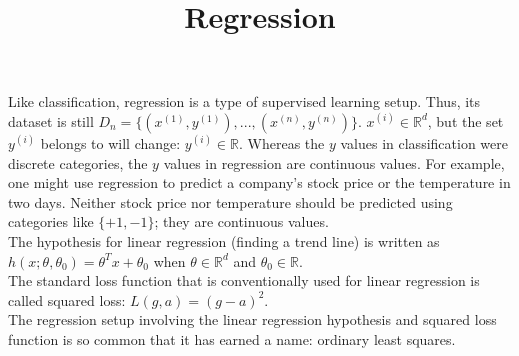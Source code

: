 \documentclass{article}
\title{Regression}
\author{ }
\date{ }
\begin{document}
	
	\maketitle 

    Like classification, regression is a type of supervised learning setup. Thus, its dataset is still $D_n = \{(x^{(1)}, y^{(1)}), ... ,(x^{(n)}, y^{(n)})\}$. $x^{(i)}\in\mathbb{R}^d$, but the set $y^{(i)}$ belongs to will change: $y^{(i)}\in\mathbb{R}$. Whereas the $y$ values in classification were discrete categories, the $y$ values in regression are continuous values. For example, one might use regression to predict a company's stock price or the temperature in two days. Neither stock price nor temperature should be predicted using categories like $\{+1, -1\}$; they are continuous values. \\

    The hypothesis for linear regression (finding a trend line) is written as $h(x; \theta, \theta_0) = \theta^Tx+\theta_0$ when $\theta\in\mathbb{R}^d$ and $\theta_0\in\mathbb{R}$. \\

    The standard loss function that is conventionally used for linear regression is called squared loss: $L(g, a) = (g-a)^2$. \\

    The regression setup involving the linear regression hypothesis and squared loss function is so common that it has earned a name: ordinary least squares. \\
\end{document}
